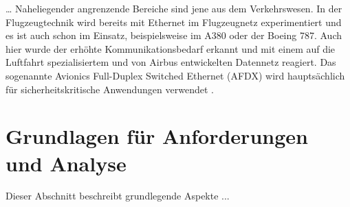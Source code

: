 \documentclass[draft=false
              ,paper=a4
              ,twoside=false
              ,fontsize=11pt
              ,headsepline
              ,BCOR10mm
              ,DIV11
              ]{scrbook}
\begin{document}
\ldots
Naheliegender angrenzende Bereiche sind jene aus dem Verkehrswesen. In der Flugzeugtechnik wird bereits mit Ethernet im Flugzeugnetz experimentiert und es ist auch schon im Einsatz, beispielsweise im A380 oder der Boeing 787. Auch hier wurde der erhöhte Kommunikationsbedarf erkannt und mit einem auf die Luftfahrt spezialisiertem und von Airbus entwickelten Datennetz reagiert. Das sogenannte Avionics Full-Duplex Switched Ethernet (AFDX) wird hauptsächlich für sicherheitskritische Anwendungen verwendet \cite{steiner_recent_2014}. 



\section{Grundlagen für Anforderungen und Analyse} %
\label{sec:anforderungen_und_analyse}
Dieser Abschnitt beschreibt grundlegende Aspekte ... 
\end{document}
